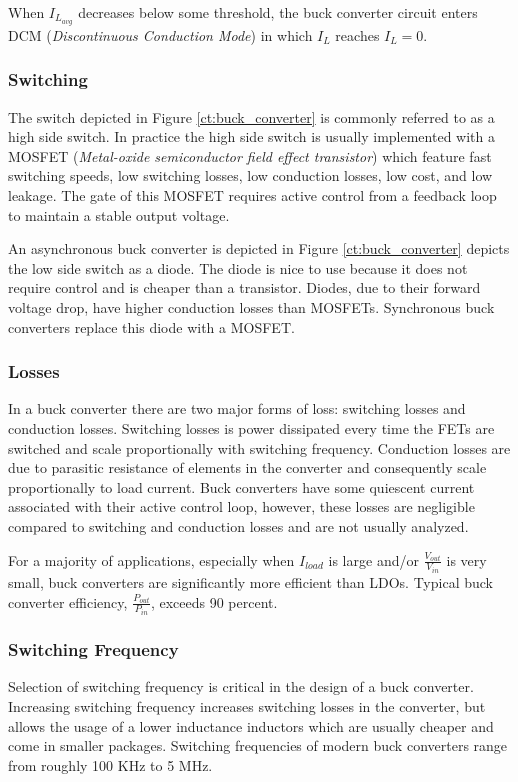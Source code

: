 \documentclass[main.tex]{subfiles}
\begin{document}

When $I_{L_{avg}}$ decreases below some threshold, the buck converter circuit enters DCM (\textit{Discontinuous Conduction Mode}) in which $I_L$ reaches $I_L = 0$.


\subsubsection{Switching}
The switch depicted in Figure \ref{ct:buck_converter} is commonly referred to as a high side switch. In practice the high side switch is usually implemented with a MOSFET (\textit{Metal-oxide semiconductor field effect transistor}) which feature fast switching speeds, low switching losses, low conduction losses, low cost, and low leakage. The gate of this MOSFET requires active control from a feedback loop to maintain a stable output voltage.

An asynchronous buck converter is depicted in Figure \ref{ct:buck_converter} depicts the low side switch as a diode. The diode is nice to use because it does not require control and is cheaper than a transistor. Diodes, due to their forward voltage drop, have higher conduction losses than MOSFETs. Synchronous buck converters replace this diode with a MOSFET. 

\subsubsection{Losses}
In a buck converter there are two major forms of loss: switching losses and conduction losses. Switching losses is power dissipated every time the FETs are switched and scale proportionally with switching frequency. Conduction losses are due to parasitic resistance of elements in the converter and consequently scale proportionally to load current. Buck converters have some quiescent current associated with their active control loop, however, these losses are negligible compared to switching and conduction losses and are not usually analyzed. 

For a majority of applications, especially when $I_{load}$ is large and/or $\frac{V_{out}}{V_{in}}$ is very small, buck converters are significantly more efficient than LDOs. Typical buck converter efficiency, $\frac{P_{out}}{P_{in}}$, exceeds 90 percent.  

\subsubsection{Switching Frequency}
Selection of switching frequency is critical in the design of a buck converter. Increasing switching frequency increases switching losses in the converter, but allows the usage of a lower inductance inductors which are usually cheaper and come in smaller packages. Switching frequencies of modern buck converters range from roughly 100 KHz to 5 MHz. 
\end{document}

